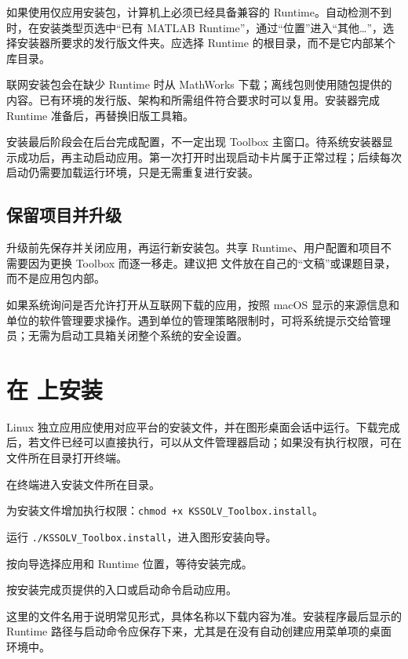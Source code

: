 如果使用仅应用安装包，计算机上必须已经具备兼容的 Runtime。自动检测不到时，在安装类型页选中“已有 MATLAB\regmark{} Runtime”，通过“位置”进入“其他…”，选择安装器所要求的发行版文件夹。应选择 Runtime 的根目录，而不是它内部某个库目录。

联网安装包会在缺少 Runtime 时从 MathWorks 下载；离线包则使用随包提供的内容。已有环境的发行版、架构和所需组件符合要求时可以复用。安装器完成 Runtime 准备后，再替换旧版工具箱。

安装最后阶段会在后台完成配置，不一定出现 Toolbox 主窗口。待系统安装器显示成功后，再主动启动应用。第一次打开时出现启动卡片属于正常过程；后续每次启动仍需要加载运行环境，只是无需重复进行安装。

\subsection{保留项目并升级}

升级前先保存并关闭应用，再运行新安装包。共享 Runtime、用户配置和项目不需要因为更换 Toolbox 而逐一移走。建议把  文件放在自己的“文稿”或课题目录，而不是应用包内部。

如果系统询问是否允许打开从互联网下载的应用，按照 macOS 显示的来源信息和单位的软件管理要求操作。遇到单位的管理策略限制时，可将系统提示交给管理员；无需为启动工具箱关闭整个系统的安全设置。

\section{在  上安装}

Linux 独立应用应使用对应平台的安装文件，并在图形桌面会话中运行。下载完成后，若文件已经可以直接执行，可以从文件管理器启动；如果没有执行权限，可在文件所在目录打开终端。

\begin{steps}
\item 在终端进入安装文件所在目录。
\item 为安装文件增加执行权限：\texttt{chmod +x KSSOLV\_Toolbox.install}。
\item 运行 \texttt{./KSSOLV\_Toolbox.install}，进入图形安装向导。
\item 按向导选择应用和 Runtime 位置，等待安装完成。
\item 按安装完成页提供的入口或启动命令启动应用。
\end{steps}

这里的文件名用于说明常见形式，具体名称以下载内容为准。安装程序最后显示的 Runtime 路径与启动命令应保存下来，尤其是在没有自动创建应用菜单项的桌面环境中。

